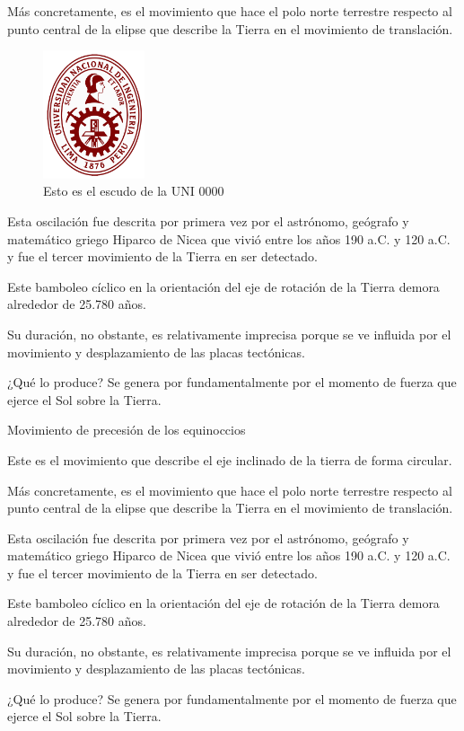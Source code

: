 \documentclass[12pt,a4paper]{article}
\begin{document}
Más concretamente, es el movimiento que hace el polo norte terrestre respecto al punto central de la elipse 
que describe la Tierra en el movimiento de translación.

\begin{figure}[H]
	\centering
	\includegraphics[width=3cm]{uni}
	\caption{Esto es el escudo de la UNI 0000}\label{fig1}
\end{figure}

Esta oscilación fue descrita por primera vez por el astrónomo, geógrafo y matemático griego Hiparco de Nicea 
que vivió entre los años 190 a.C. y 120 a.C. y fue el tercer movimiento de la Tierra en ser detectado.

Este bamboleo cíclico en la orientación del eje de rotación de la Tierra demora alrededor de 25.780 años. 

Su duración, no obstante, es relativamente imprecisa porque se ve influida por el movimiento y desplazamiento 
de las placas tectónicas.

¿Qué lo produce? Se genera por fundamentalmente por el momento de fuerza que ejerce el Sol sobre la Tierra.

Movimiento de precesión de los equinoccios

Este es el movimiento que describe el eje inclinado de la tierra de forma circular.

Más concretamente, es el movimiento que hace el polo norte terrestre respecto al punto central de la elipse 
que describe la Tierra en el movimiento de translación.

Esta oscilación fue descrita por primera vez por el astrónomo, geógrafo y matemático griego Hiparco de Nicea 
que vivió entre los años 190 a.C. y 120 a.C. y fue el tercer movimiento de la Tierra en ser detectado.

Este bamboleo cíclico en la orientación del eje de rotación de la Tierra demora alrededor de 25.780 años. 

Su duración, no obstante, es relativamente imprecisa porque se ve influida por el movimiento y desplazamiento 
de las placas tectónicas.

¿Qué lo produce? Se genera por fundamentalmente por el momento de fuerza que ejerce el Sol sobre la Tierra.
\end{document}

